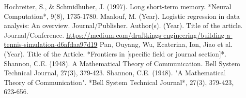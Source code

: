 \documentclass[12pt]{article}  %
\begin{document}
\clearpage
\begin{spacing}{0.01}
\begin{thebibliography}{99}
     Hochreiter, S., \& Schmidhuber, J. (1997). Long short-term memory. *Neural Computation*, 9(8), 1735-1780. 
     Maalouf, M. (Year). Logistic regression in data analysis: An overview. Journal/Publisher.
     Author(s). (Year). Title of the article. Journal/Conference.
     \url{https://medium.com/draftkings-engineering/building-a-tennis-simulation-d6afdaa97d19}
     Pan, Ouyang, Wu, Ecaterina, Ion, Jiao et al. (Year). Title of the Article. *Frontiers in [specific field or journal section]*.
     Shannon, C.E. (1948). A Mathematical Theory of Communication. Bell System Technical Journal, 27(3), 379-423.
     Shannon, C.E. (1948). "A Mathematical Theory of Communication". *Bell System Technical Journal*, 27(3), 379-423, 623-656.

\end{thebibliography}
\end{spacing}
\end{document}
